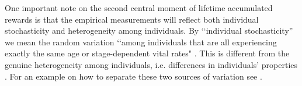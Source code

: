 \documentclass[\main/main.tex]{subfiles}
\begin{document}
One important note on the second central moment of lifetime accumulated rewards is that the empirical measurements will reflect both individual stochasticity and heterogeneity among individuals. By \lq\lq individual stochasticity'' we mean the random variation \lq\lq among individuals that are all experiencing exactly the same age or stage-dependent vital rates" \citep{Caswell2015}. This is different from the genuine heterogeneity among individuals, i.e. differences in individuals' properties \citep{Hartemink2017a, Caswell2011}. For an example on how to separate these two sources of variation see \cite{Caswell2001, Caswell2014}.\\
\end{document}
